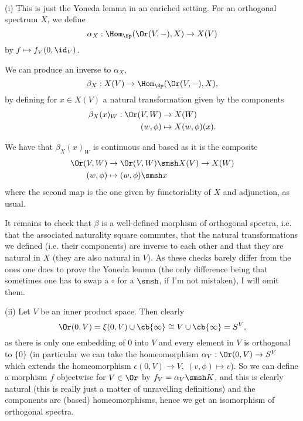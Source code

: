 

\mmaketitle

\begin{exercise}[1]\ 

(i) This is just the Yoneda lemma in an enriched setting. For an orthogonal spectrum $X$, we define
\[\alpha_X:\Hom_\Sp(\Or(V,-),X)\to X(V)\]
by $f\mapsto f_V(0, \id_V)$.

We can produce an inverse to $\alpha_X$,
\[\beta_X:X(V)\to\Hom_\Sp(\Or(V,-),X),\]
by defining for $x\in X(V)$ a natural transformation given by the components
\begin{align*}
    \beta_X(x)_W:\Or(V,W)&\to X(W)\\
    (w,\phi)&\mapsto X(w,\phi)(x).
\end{align*}

We have that $\beta_X(x)_W$ is continuous and based as it is the composite
\begin{align*}
\Or(V,W)&\to\Or(V,W)\smsh X(V)\to X(W)\\
(w,\phi)&\mapsto(w,\phi)\smsh x
\end{align*}
where the second map is the one given by functoriality of $X$ and adjunction, as usual.

It remains to check that $\beta$ is a well-defined morphism of orthogonal spectra, i.e. that the associated naturality square commutes, that the natural transformations we defined (i.e. their components) are inverse to each other and that they are natural in $X$ (they are also natural in $V$). As these checks barely differ from the ones one does to prove the Yoneda lemma (the only difference being that sometimes one has to swap a $\circ$ for a $\smsh$, if I'm not mistaken), I will omit them.

(ii) Let $V$ be an inner product space. Then clearly \[\Or(0,V)=\xi(0,V)\cup\cb{\infty}\cong
V\cup\cb{\infty} = S^V,\]
as there is only one embedding of $0$ into $V$ and every element in $V$ is
orthogonal to $\{0\}$ (in particular we can take the homeomorphism $\alpha_V:\Or(0,V)\to S^V$ which extends the homeomorphism $\epsilon(0,V)\to V,\ (v,\phi)\mapsto v$). So we can define a morphism $f$ objectwise for $V\in\Or$ by $f_V=\alpha_V\smsh K$, and this is clearly natural (this is really just a matter of unravelling definitions) and the components are (based) homeomorphisms, hence we get an isomorphism of orthogonal
spectra.
\end{exercise}\newpage

